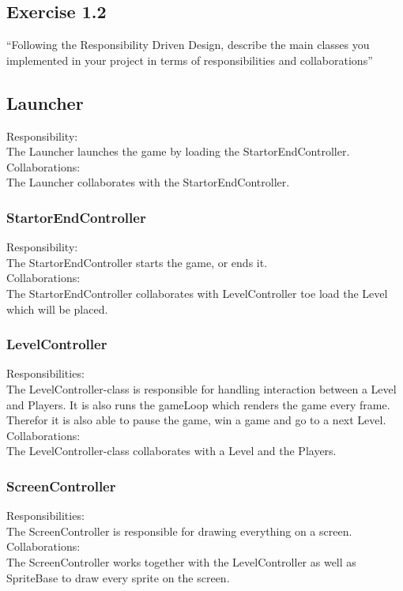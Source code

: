 \subsection{Exercise 1.2}
``Following the Responsibility Driven Design, describe the main classes you implemented in your project in terms of responsibilities and collaborations''

\subsection{Launcher}
Responsibility: \\
The Launcher launches the game by loading the StartorEndController. \\
Collaborations: \\
The Launcher collaborates with the StartorEndController. 

\subsubsection{StartorEndController}
Responsibility: \\
The StartorEndController starts the game, or ends it. \\
Collaborations: \\
The StartorEndController collaborates with LevelController toe load the Level which will be placed. 

\subsubsection{LevelController}
Responsibilities: \\
The LevelController-class is responsible for handling interaction between a Level and Players. It is also runs the gameLoop which renders the game every frame. Therefor it is also able to pause the game, win a game and go to a next Level. \\
Collaborations: \\
The LevelController-class collaborates with a Level and the Players.

\subsubsection{ScreenController}
Responsibilities: \\
The ScreenController is responsible for drawing everything on a screen. \\
Collaborations: \\
The ScreenController works together with the LevelController as well as SpriteBase to draw every sprite on the screen. 

